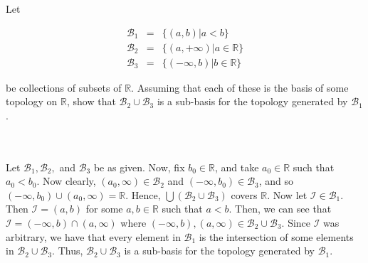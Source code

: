 Let 

$$\begin{array}{rcl}
\mathcal{B}_1&=&\{(a,b)|a < b\}\\
\mathcal{B}_2&=&\{(a,+\infty)|a\in \mathbb{R}\}\\
\mathcal{B}_3&=&\{(-\infty,b)|b\in\mathbb{R}\}
\end{array}$$

be collections of subsets of $\mathbb{R}$. Assuming that each of these is the basis of some topology on
$\mathbb{R}$, show that $\mathcal{B}_2\cup \mathcal{B}_3$ is a sub-basis for the topology generated by
$\mathcal{B}_1$.\\\\

\begin{solution}\renewcommand{\qedsymbol}{}\ \\
    Let $\mathcal{B}_1, \mathcal{B}_2,$ and $\mathcal{B}_3$ be as given. Now, fix $b_0\in\mathbb{R}$,
    and take $a_0\in\mathbb{R}$ such that $a_0<b_0$. Now clearly, $(a_0,\infty)\in\mathcal{B}_2$ and
    $(-\infty,b_0)\in\mathcal{B}_3$, and so $(-\infty,b_0)\cup(a_0,\infty)=\mathbb{R}$. Hence,
    $\bigcup(\mathcal{B}_2\cup\mathcal{B}_3)$ covers $\mathbb{R}$. Now let
    $\mathcal{I}\in\mathcal{B}_1$. Then $\mathcal{I}=(a,b)$ for some $a,b\in\mathbb{R}$ such that $a<b$.
    Then, we can see that $\mathcal{I}=(-\infty, b)\cap(a,\infty)$ where
    $(-\infty, b),(a,\infty)\in\mathcal{B}_2\cup \mathcal{B}_3$. Since $\mathcal{I}$ was arbitrary, we
    have that every element in $\mathcal{B}_1$ is the intersection of some elements in
    $\mathcal{B}_2\cup \mathcal{B}_3$. Thus, $\mathcal{B}_2\cup \mathcal{B}_3$ is a sub-basis for the
    topology generated by $\mathcal{B}_1$.

\end{solution}